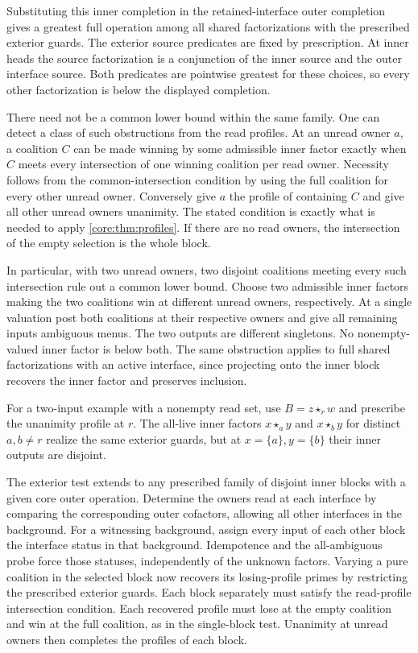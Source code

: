 Substituting this inner completion in the retained-interface
outer completion gives a greatest full operation among all
shared factorizations with the prescribed exterior guards.
The exterior source predicates are fixed by prescription. At
inner heads the source factorization is a conjunction of the
inner source and the outer interface source. Both predicates
are pointwise greatest for these choices, so every other
factorization is below the displayed completion.

There need not be a common lower bound within the same family.
One can detect a class of such obstructions from the read profiles.
At an unread owner $a$, a coalition $C$ can be made winning by
some admissible inner factor exactly when $C$ meets every
intersection of one winning coalition per read owner. Necessity
follows from the common-intersection condition by using the full
coalition for every other unread owner. Conversely give $a$ the
profile of containing $C$ and give all other unread owners
unanimity. The stated condition is exactly what is needed to
apply \cref{core:thm:profiles}. If there are no read owners,
the intersection of the empty selection is the whole block.

In particular, with two unread owners, two disjoint coalitions
meeting every such intersection rule out a common lower bound.
Choose two admissible inner factors making the two coalitions
win at different unread owners, respectively. At a single
valuation post both coalitions at their respective owners and
give all remaining inputs ambiguous menus. The two outputs
are different singletons. No nonempty-valued inner factor is
below both. The same obstruction applies to full shared
factorizations with an active interface, since projecting onto
the inner block recovers the inner factor and preserves inclusion.

For a two-input example with a nonempty read set, use
$B=z\star_r w$ and prescribe the unanimity profile at $r$.
The all-live inner factors $x\star_a y$ and $x\star_b y$ for
distinct $a,b\ne r$ realize the same exterior guards, but at
$x=\{a\},y=\{b\}$ their inner outputs are disjoint.

The exterior test extends to any prescribed family of disjoint
inner blocks with a given core outer operation. Determine the
owners read at each interface by comparing the corresponding
outer cofactors, allowing all other interfaces in the background.
For a witnessing background, assign every input of each other
block the interface status in that background. Idempotence and
the all-ambiguous probe force those statuses, independently of
the unknown factors. Varying a pure coalition in the selected
block now recovers its losing-profile primes by restricting the
prescribed exterior guards. Each block separately must satisfy
the read-profile intersection condition. Each recovered profile
must lose at the empty coalition and win at the full coalition,
as in the single-block test. Unanimity at unread owners then
completes the profiles of each block.


